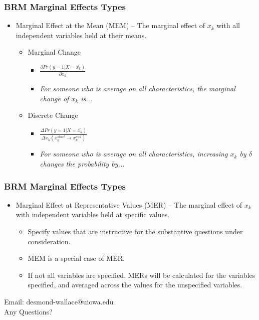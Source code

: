 \documentclass{beamer}
\begin{document}
\begin{frame}
	\frametitle{BRM Marginal Effects Types}
		\begin{itemize}
			\item Marginal Effect at the Mean (MEM) -- The marginal effect of $x_{k}$ with all independent variables held at their means.
				\begin{itemize}
					\item Marginal Change
					\begin{itemize}
						\item $\frac{\partial Pr\left(y=1|X=\bar{x_{k}}\right)}{\partial x_{k}}$
						\item \textit{For someone who is average on all characteristics, the marginal change of $x_{k}$ is...}
					\end{itemize}
				\item Discrete Change
					\begin{itemize}
						\item $\frac{\Delta Pr\left(y=1|X=\bar{x_{k}}\right)}{\Delta x_{k}\left(x^{start}_{k}\rightarrow x^{end}_{k}\right)}$
						\item \textit{For someone who is average on all characteristics, increasing $x_{k}$ by $\delta$ changes the probability by...}
					\end{itemize}
			\end{itemize}
		\end{itemize}
\end{frame}

\begin{frame}
	\frametitle{BRM Marginal Effects Types}
		\begin{itemize}
			\item Marginal Effect at Representative Values (MER) -- The marginal effect of $x_{k}$ with independent variables held at specific values.
				\begin{itemize}
					\item Specify values that are instructive for the substantive questions under consideration.
					\item MEM is a special case of MER.
					\item If not all variables are specified, MERs will be calculated for the variables specified, and averaged across the values for the unspecified variables.
				\end{itemize}
		\end{itemize}
\end{frame}

\begin{frame}
	\begin{center}
		\begin{LARGE}
			Email: desmond-wallace@uiowa.edu\\
			Any Questions?
		\end{LARGE}
	\end{center}
\end{frame}
\end{document}
